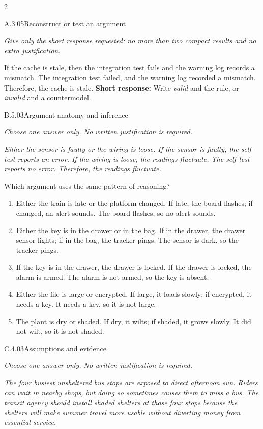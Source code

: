 \documentclass[9pt]{extarticle}
\newcommand{\choice}[1]{\item #1}
\begin{document}
\begin{multicols}{2}
\begin{DenseCoreProblem}{A.3.05}{Reconstruct or test an argument}
{\scriptsize\textit{Give only the short response requested: no more than two compact results and no extra justification.}\par}
If the cache is stale, then the integration test fails and the warning log records a mismatch. The integration test failed, and the warning log recorded a mismatch. Therefore, the cache is stale.
\textbf{Short response:} Write \emph{valid} and the rule, or \emph{invalid} and a countermodel.
\end{DenseCoreProblem}
\begin{DenseCoreProblem}{B.5.03}{Argument anatomy and inference}
{\scriptsize\textit{Choose one answer only. No written justification is required.}\par}
\emph{Either the sensor is faulty or the wiring is loose. If the sensor is faulty, the self-test reports an error. If the wiring is loose, the readings fluctuate. The self-test reports no error. Therefore, the readings fluctuate.}

Which argument uses the same pattern of reasoning?
\begin{enumerate}[label=(\alph*)]
  \choice{Either the train is late or the platform changed. If late, the board flashes; if changed, an alert sounds. The board flashes, so no alert sounds.}
  \choice{Either the key is in the drawer or in the bag. If in the drawer, the drawer sensor lights; if in the bag, the tracker pings. The sensor is dark, so the tracker pings.}
  \choice{If the key is in the drawer, the drawer is locked. If the drawer is locked, the alarm is armed. The alarm is not armed, so the key is absent.}
  \choice{Either the file is large or encrypted. If large, it loads slowly; if encrypted, it needs a key. It needs a key, so it is not large.}
  \choice{The plant is dry or shaded. If dry, it wilts; if shaded, it grows slowly. It did not wilt, so it is not shaded.}
\end{enumerate}
\end{DenseCoreProblem}
\columnbreak
\begin{DenseCoreProblem}{C.4.03}{Assumptions and evidence}
{\scriptsize\textit{Choose one answer only. No written justification is required.}\par}
\emph{The four busiest unsheltered bus stops are exposed to direct afternoon sun. Riders can wait in nearby shops, but doing so sometimes causes them to miss a bus. The transit agency should install shaded shelters at those four stops because the shelters will make summer travel more usable without diverting money from essential service.}


\end{DenseCoreProblem}
\end{multicols}
\end{document}
